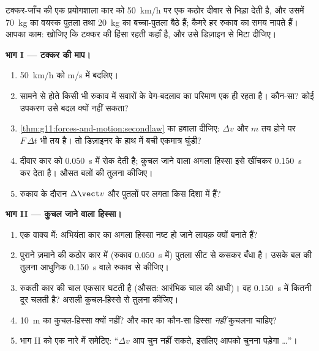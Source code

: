 \begin{problem}
\label{pb:g11:forces-and-motion:1}
टक्कर-जाँच की एक प्रयोगशाला कार को \qty{50}{km/h} पर एक कठोर दीवार से भिड़ा देती
है, और उसमें \qty{70}{kg} का वयस्क पुतला तथा \qty{20}{kg} का बच्चा-पुतला बैठे हैं;
कैमरे हर रुकाव का समय नापते हैं। आपका काम: खोजिए कि टक्कर की हिंसा रहती कहाँ
है, और उसे डिज़ाइन से मिटा दीजिए।

\medskip
\noindent\textbf{भाग I --- टक्कर की माप।}
\begin{enumerate}
  \item \qty{50}{km/h} को \unit{m/s} में बदलिए।
  \item सामने से होते किसी भी रुकाव में सवारों के वेग-बदलाव का परिमाण एक ही
        रहता है। कौन-सा? कोई उपकरण उसे बदल क्यों नहीं सकता?
  \item \cref{thm:g11:forces-and-motion:secondlaw} का हवाला दीजिए: $\Delta v$ और $m$ तय होने पर $F\,\Delta t$ भी तय
        है। तो डिज़ाइनर के हाथ में बची एकमात्र घुंडी?
  \item दीवार कार को \qty{0.050}{s} में रोक देती है; कुचल जाने वाला अगला हिस्सा इसे
        खींचकर \qty{0.150}{s} कर देता है। औसत बलों की तुलना कीजिए।
  \item रुकाव के दौरान $\Delta \vect v$ और पुतलों पर लगता  किस
        दिशा में हैं?
\end{enumerate}

\medskip
\noindent\textbf{भाग II --- कुचल जाने वाला हिस्सा।}
\begin{enumerate}[resume]
  \item एक वाक्य में: अभियंता कार का अगला हिस्सा नष्ट हो जाने लायक़ क्यों
        बनाते हैं?
  \item पुराने ज़माने की कठोर कार में (रुकाव \qty{0.050}{s} में) पुतला सीट से कसकर
        बँधा है। उसके बल की तुलना आधुनिक \qty{0.150}{s} वाले रुकाव से
        कीजिए।
  \item रुकती कार की चाल एकसार घटती है (औसत: आरंभिक चाल की आधी)। वह \qty{0.150}{s}
        में कितनी दूर चलती है? असली कुचल-हिस्से से तुलना कीजिए।
  \item \qty{10}{m} का कुचल-हिस्सा क्यों नहीं? और कार का कौन-सा हिस्सा
        \emph{नहीं} कुचलना चाहिए?
  \item भाग II को एक नारे में समेटिए: ``$\Delta v$ आप चुन नहीं सकते, इसलिए आपको
        चुनना पड़ेगा \dots''।
\end{enumerate}


\end{problem}
